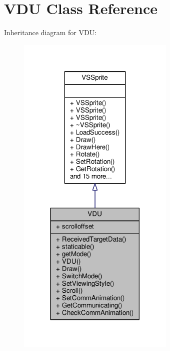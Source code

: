 \hypertarget{classVDU}{}\section{V\+DU Class Reference}
\label{classVDU}


Inheritance diagram for V\+DU\+:
\nopagebreak
\begin{figure}[H]
\begin{center}
\leavevmode
\includegraphics[width=213pt]{d7/d6b/classVDU__inherit__graph}
\end{center}
\end{figure}


